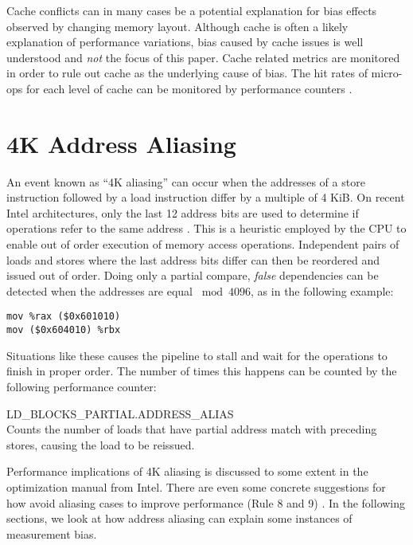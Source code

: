 \documentclass[a4paper,11pt,twocolumn,twoside]{article}
\begin{document}
Cache conflicts can in many cases be a potential explanation for bias effects observed by changing memory layout.
Although cache is often a likely explanation of performance variations, bias caused by cache issues is well understood and \emph{not} the focus of this paper.
Cache related metrics are monitored in order to rule out cache as the underlying cause of bias. 
The hit rates of micro-ops for each level of cache can be monitored by performance counters \cite{Intel:2012:OptimizationManual}.


\section{4K Address Aliasing}
An event known as “4K aliasing” can occur when the addresses of a store instruction followed by a load instruction differ by a multiple of 4 KiB.
On recent Intel architectures, only the last 12 address bits are used to determine if operations refer to the same address \cite{Intel:2012:OptimizationManual}.
This is a heuristic employed by the CPU to enable out of order execution of memory access operations.
Independent pairs of loads and stores where the last address bits differ can then be reordered and issued out of order.
Doing only a partial compare, \emph{false} dependencies can be detected when the addresses are equal $\bmod 4096$, as in the following example: 
\begin{lstlisting}[language={[x86masm]Assembler}]
mov %rax ($0x601010)
mov ($0x604010) %rbx
\end{lstlisting}
Situations like these causes the pipeline to stall and wait for the operations to finish in proper order.
The number of times this happens can be counted by the following performance counter:
\begin{description}
  \item{LD\_BLOCKS\_PARTIAL.ADDRESS\_ALIAS} \hfill \\
  Counts the number of loads that have partial address match with preceding stores, causing the load to be reissued.
\end{description}
Performance implications of 4K aliasing is discussed to some extent in the optimization manual from Intel. 
There are even some concrete suggestions for how avoid aliasing cases to improve performance (Rule 8 and 9) \cite{Intel:2012:OptimizationManual}.
In the following sections, we look at how address aliasing can explain some instances of measurement bias.
\end{document}
